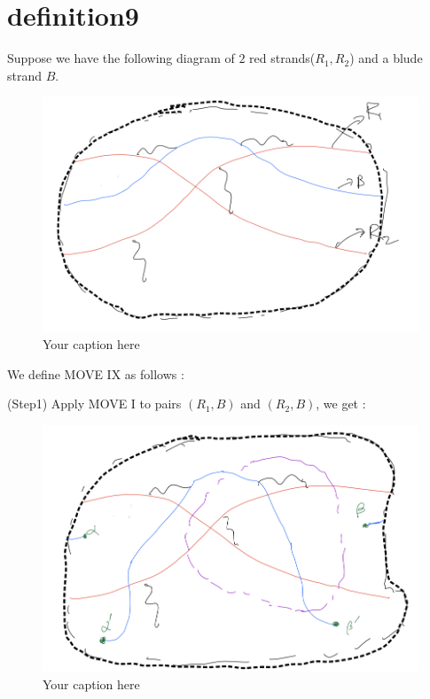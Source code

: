\section{definition9}
\begin{definition}
\end{definition}

Suppose we have the following diagram of $2$ red strands($R_1,R_2$) and a blude strand $B$.

\begin{figure}[H] %
    \centering
    \includegraphics[width=\linewidth]{diagrams/definition9/1.png} %
    \caption{Your caption here}
    \label{fig:your-label}
\end{figure}

We define MOVE \RN{9} as follows :

(Step1) Apply MOVE \RN{1} to pairs $(R_1,B)$ and $(R_2,B)$, we get :

\begin{figure}[H] %
    \centering
    \includegraphics[width=\linewidth]{diagrams/definition9/2.png} %
    \caption{Your caption here}
    \label{fig:your-label}
\end{figure}

